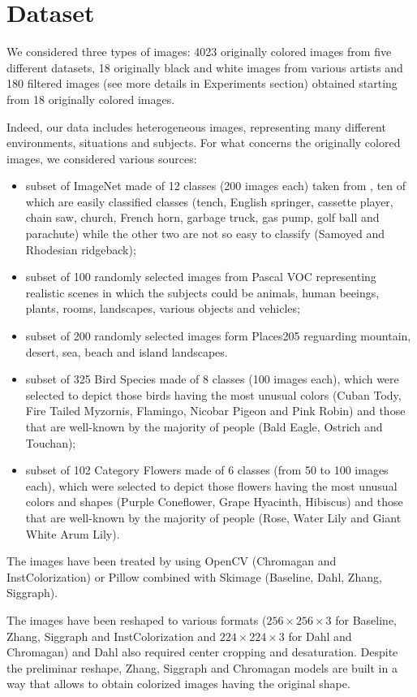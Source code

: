 \section{Dataset}
We considered three types of images: 4023 originally colored images from five different datasets, 18 originally black and white images from various artists and 180 filtered images (see more details in Experiments section) obtained starting from 18 originally colored images.

Indeed, our data includes heterogeneous images, representing many different environments, situations and subjects.
For what concerns the originally colored images, we considered various sources:
\begin{itemize}
	\item subset of ImageNet made of 12 classes (200 images each) taken from \cite{imagenette}, ten of which are easily classified classes (tench, English springer, cassette player, chain saw, church, French horn, garbage truck, gas pump, golf ball and parachute) while the other two are not so easy to classify (Samoyed and Rhodesian ridgeback);
	\item subset of 100 randomly selected images from Pascal VOC \cite{pascal} representing realistic scenes in which the subjects could be animals, human beeings, plants, rooms, landscapes, various objects and vehicles;
	\item subset of 200 randomly selected images form Places205 \cite{place} reguarding mountain, desert, sea, beach and island landscapes.
	\item subset of 325 Bird Species \cite{bird} made of 8 classes (100 images each), which were selected to depict those birds having the most unusual colors (Cuban Tody, Fire Tailed Myzornis, Flamingo, Nicobar Pigeon and Pink Robin) and those that are well-known by the majority of people (Bald Eagle, Ostrich and Touchan);
	\item subset of 102 Category Flowers \cite{flower} made of 6 classes (from 50 to 100 images each), which were selected to depict those flowers having the most unusual colors and shapes (Purple Coneflower, Grape Hyacinth, Hibiscus) and those that are well-known by the majority of people (Rose, Water Lily and Giant White Arum Lily).
\end{itemize}

The images have been treated by using OpenCV (Chromagan and InstColorization) or Pillow combined with Skimage (Baseline, Dahl, Zhang, Siggraph).

The images have been reshaped to various formats ($256\times256\times3$ for Baseline, Zhang, Siggraph and InstColorization and $224\times224\times3$ for Dahl and Chromagan) and Dahl also required center cropping and desaturation. Despite the preliminar reshape, Zhang, Siggraph and Chromagan models are built in a way that allows to obtain colorized images having the original shape.

